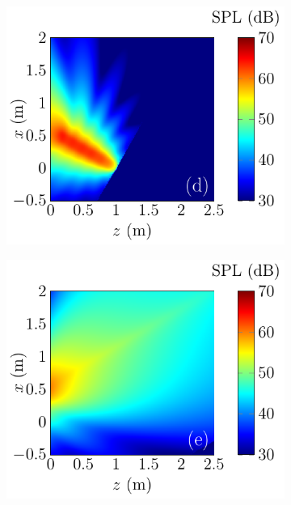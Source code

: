 \begin{figure}[!htb]
\begin{subfigure}{0.32\textwidth}
    \end{subfigure}
    \\
    \begin{subfigure}{0.32\textwidth}
        \centering
        \includegraphics[width = \textwidth]{fig/ComputePalReflectionTruncated_Ultra60000_LocSurface1m_Absorp90_Orignal_211013W.pdf}
    \end{subfigure}
    \begin{subfigure}{0.32\textwidth}
        \centering
        \includegraphics[width = \textwidth]{fig/ComputePalReflectionTruncated_Ultra60000_LocSurface1m_Absorp90_Image_211013X.pdf}

\end{subfigure}
\end{figure}
